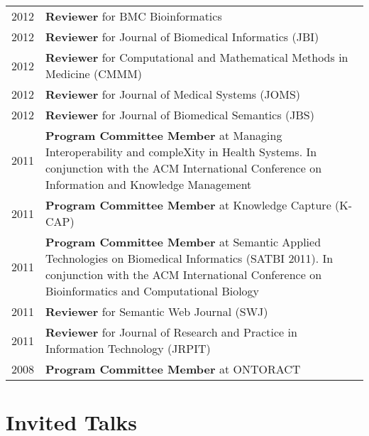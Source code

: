 \documentclass[11pt,fullpage]{article}
\begin{document}
\begin{longtable}{p{0.5in}|p{5.5in}}
2012  & \textbf{Reviewer} for BMC Bioinformatics \\
2012  & \textbf{Reviewer} for Journal of Biomedical Informatics (JBI) \\
2012  & \textbf{Reviewer} for Computational and Mathematical Methods in Medicine (CMMM) \\
2012  & \textbf{Reviewer} for Journal of Medical Systems (JOMS) \\
2012  & \textbf{Reviewer} for Journal of Biomedical Semantics (JBS) \\
2011 & \textbf{Program Committee Member} at Managing Interoperability and compleXity in Health Systems. In conjunction with the ACM International Conference on Information and Knowledge Management\\
2011 & \textbf{Program Committee Member} at Knowledge Capture (K-CAP)\\
2011 & \textbf{Program Committee Member} at Semantic Applied Technologies on Biomedical Informatics (SATBI 2011). In conjunction with the ACM International Conference on Bioinformatics and Computational Biology\\
2011  & \textbf{Reviewer} for Semantic Web Journal (SWJ) \\
2011  & \textbf{Reviewer} for Journal of Research and Practice in Information Technology (JRPIT)\\
2008 & \textbf{Program Committee Member} at ONTORACT \\

\end{longtable}




\section*{Invited Talks}
\end{document}
